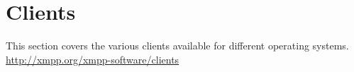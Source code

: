 \part{Clients}

\newpage
This section covers the various clients available for different operating systems.
\url{http://xmpp.org/xmpp-software/clients}
